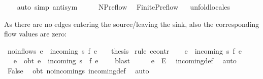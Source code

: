\begin{isabellebody}
\ \ \isamarkupfalse%
\ {\isacharparenleft}auto\ simp{\isacharcolon}\ antisym{\isacharparenright}%
\endisatagproof
{\isafoldproof}%
%
\isadelimproof
\isanewline
%
\endisadelimproof
\ \ \isanewline
{}\isamarkupfalse%
\ %
%
\isamarkuptrue%
\isamarkupfalse%
\ NPreflow\ \isanewline
{}\isanewline
\isanewline
{}\isamarkupfalse%
\ Finite{\isacharunderscore}Preflow%
\isadelimproof
\ %
\endisadelimproof
%
\isatagproof
{}\isamarkupfalse%
\ unfold{\isacharunderscore}locales%
\endisatagproof
{\isafoldproof}%
%
\isadelimproof
%
\endisadelimproof
%
\begin{isamarkuptext}%
As there are no edges entering the source/leaving the sink, 
  also the corresponding flow values are zero:%
\end{isamarkuptext}\isamarkuptrue%
\isamarkupfalse%
\ no{\isacharunderscore}inflow{\isacharunderscore}s{\isacharcolon}\ {\isachardoublequoteopen}{\isasymforall}e\ {\isasymin}\ incoming\ s{\isachardot}\ f\ e\ {\isacharequal}\ {}{\isachardoublequoteclose}\ {\isacharparenleft}\ {\isacharquery}thesis{\isacharparenright}\isanewline
%
\isadelimproof
%
\endisadelimproof
%
\isatagproof
{}\isamarkupfalse%
\ {\isacharparenleft}rule\ ccontr{\isacharparenright}\isanewline
\ \ \isamarkupfalse%
\ {\isachardoublequoteopen}{\isasymnot}{\isacharparenleft}{\isasymforall}e\ {\isasymin}\ incoming\ s{\isachardot}\ f\ e\ {\isacharequal}\ {}{\isacharparenright}{\isachardoublequoteclose}\isanewline
\ \ \isamarkupfalse%
\ \isamarkupfalse%
\ e\ \ obt{}{\isacharcolon}\ {\isachardoublequoteopen}e\ {\isasymin}\ incoming\ s\ {\isasymand}\ f\ e\ {\isasymnoteq}\ {}{\isachardoublequoteclose}\ \isamarkupfalse%
\ blast\isanewline
\ \ \isamarkupfalse%
\ \isamarkupfalse%
\ {\isachardoublequoteopen}e\ {\isasymin}\ E{\isachardoublequoteclose}\ \isamarkupfalse%
\ incoming{\isacharunderscore}def\ \isamarkupfalse%
\ auto\isanewline
\ \ \isamarkupfalse%
\ {\isachardoublequoteopen}False{\isachardoublequoteclose}\ \isamarkupfalse%
\ obt{}\ no{\isacharunderscore}incoming{\isacharunderscore}s\ incoming{\isacharunderscore}def\ \isamarkupfalse%
\ auto\isanewline
{}\isamarkupfalse%

\end{isabellebody}
